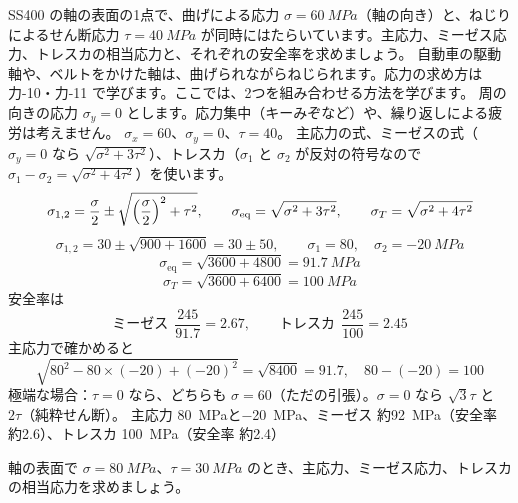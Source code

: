 \begin{phreidai}[曲げとねじりを同時に受ける軸]
\label{ph:力-9:ex7}SS400 の軸の表面の1点で、曲げによる応力 $\sigma=\qty{60}{MPa}$（軸の向き）と、ねじりによるせん断応力 $\tau=\qty{40}{MPa}$ が同時にはたらいています。主応力、ミーゼス応力、トレスカの相当応力と、それぞれの安全率を求めましょう。
\phbamen
自動車の駆動軸や、ベルトをかけた軸は、曲げられながらねじられます。応力の求め方は力-10・力-11 で学びます。ここでは、2つを組み合わせる方法を学びます。
\phmushi
周の向きの応力 $\sigma_y=0$ とします。応力集中（キーみぞなど）や、繰り返しによる疲労は考えません。
\phzu
$\sigma_x=60$、$\sigma_y=0$、$\tau=40$。
\phriyu
主応力の式、ミーゼスの式（$\sigma_y=0$ なら $\sqrt{\sigma^2+3\tau^2}$）、トレスカ（$\sigma_1$ と $\sigma_2$ が反対の符号なので $\sigma_1-\sigma_2=\sqrt{\sigma^2+4\tau^2}$）を使います。
\phtateru
\[\sigma_{1,2}=\frac{\sigma}{2}\pm\sqrt{\Bigl(\frac{\sigma}{2}\Bigr)^2+\tau^2},\qquad\sigma_{\mathrm{eq}}=\sqrt{\sigma^2+3\tau^2},\qquad\sigma_T=\sqrt{\sigma^2+4\tau^2}\]
\phtoku
\[\sigma_{1,2}=30\pm\sqrt{900+1600}=30\pm50,\qquad\sigma_1=80,\quad\sigma_2=\qty{-20}{MPa}\]
\[\sigma_{\mathrm{eq}}=\sqrt{3600+4800}=\qty{91.7}{MPa}\]
\[\sigma_T=\sqrt{3600+6400}=\qty{100}{MPa}\]
安全率は
\[\text{ミーゼス}\ \ \frac{245}{91.7}=2.67,\qquad\text{トレスカ}\ \ \frac{245}{100}=2.45\]
\phtashikame
主応力で確かめると
\[\sqrt{80^2-80\times(-20)+(-20)^2}=\sqrt{8400}=91.7,\quad80-(-20)=100\]
極端な場合：$\tau=0$ なら、どちらも $\sigma=60$（ただの引張）。$\sigma=0$ なら $\sqrt3\tau$ と $2\tau$（純粋せん断）。
\kotae 主応力 \qty{80}{MPa}と\qty{-20}{MPa}、ミーゼス 約\qty{92}{MPa}（安全率 約2.6）、トレスカ \qty{100}{MPa}（安全率 約2.4）
\end{phreidai}
\begin{jibun}
軸の表面で $\sigma=\qty{80}{MPa}$、$\tau=\qty{30}{MPa}$ のとき、主応力、ミーゼス応力、トレスカの相当応力を求めましょう。
\end{jibun}

